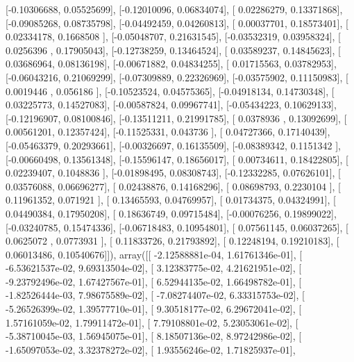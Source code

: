 \documentclass{article}
\begin{document}
       [-0.10306688,  0.05525699],
       [-0.12010096,  0.06834074],
       [ 0.02286279,  0.13371868],
       [-0.09085268,  0.08735798],
       [-0.04492459,  0.04260813],
       [ 0.00037701,  0.18573401],
       [ 0.02334178,  0.1668508 ],
       [-0.05048707,  0.21631545],
       [-0.03532319,  0.03958324],
       [ 0.0256396 ,  0.17905043],
       [-0.12738259,  0.13464524],
       [ 0.03589237,  0.14845623],
       [ 0.03686964,  0.08136198],
       [-0.00671882,  0.04834255],
       [ 0.01715563,  0.03782953],
       [-0.06043216,  0.21069299],
       [-0.07309889,  0.22326969],
       [-0.03575902,  0.11150983],
       [ 0.0019446 ,  0.056186  ],
       [-0.10523524,  0.04575365],
       [-0.04918134,  0.14730348],
       [ 0.03225773,  0.14527083],
       [-0.00587824,  0.09967741],
       [-0.05434223,  0.10629133],
       [-0.12196907,  0.08100846],
       [-0.13511211,  0.21991785],
       [ 0.0378936 ,  0.13092699],
       [ 0.00561201,  0.12357424],
       [-0.11525331,  0.043736  ],
       [ 0.04727366,  0.17140439],
       [-0.05463379,  0.20293661],
       [-0.00326697,  0.16135509],
       [-0.08389342,  0.1151342 ],
       [-0.00660498,  0.13561348],
       [-0.15596147,  0.18656017],
       [ 0.00734611,  0.18422805],
       [ 0.02239407,  0.1048836 ],
       [-0.01898495,  0.08308743],
       [-0.12332285,  0.07626101],
       [ 0.03576088,  0.06696277],
       [ 0.02438876,  0.14168296],
       [ 0.08698793,  0.2230104 ],
       [ 0.11961352,  0.071921  ],
       [ 0.13465593,  0.04769957],
       [ 0.01734375,  0.04324991],
       [ 0.04490384,  0.17950208],
       [ 0.18636749,  0.09715484],
       [-0.00076256,  0.19899022],
       [-0.03240785,  0.15474336],
       [-0.06718483,  0.10954801],
       [ 0.07561145,  0.06037265],
       [ 0.0625072 ,  0.0773931 ],
       [ 0.11833726,  0.21793892],
       [ 0.12248194,  0.19210183],
       [ 0.06013486,  0.10540676]]), array([[ -2.12588881e-04,   1.61761346e-01],
       [ -6.53621537e-02,   9.69313504e-02],
       [  3.12383775e-02,   4.21621951e-02],
       [ -9.23792496e-02,   1.67427567e-01],
       [  6.52944135e-02,   1.66498782e-01],
       [ -1.82526444e-03,   7.98675589e-02],
       [ -7.08274407e-02,   6.33315753e-02],
       [ -5.26526399e-02,   1.39577710e-01],
       [  9.30518177e-02,   6.29672041e-02],
       [  1.57161059e-02,   1.79911472e-01],
       [  7.79108801e-02,   5.23053061e-02],
       [ -5.38710045e-03,   1.56945075e-01],
       [  8.18507136e-02,   8.97242986e-02],
       [ -1.65097053e-02,   3.32378272e-02],
       [  1.93556246e-02,   1.71825937e-01],
\end{document}
